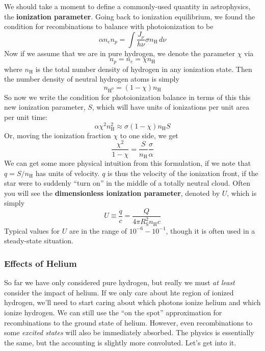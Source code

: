\documentclass[10pt]{article}
\numberwithin{equation}{section}
\newcommand{\n}{\noindent}
\begin{document}
\n We should take a moment to define a commonly-used quantity in astrophysics,
the \textbf{ionization parameter}. Going back to ionization equilibrium, we
found the condition for recombinations to balance with photoionization to be
\begin{equation}
  \label{eq:ip:1} \alpha n_e n_p = \int \frac{J_\nu}{h\nu}\sigma n_{\mathrm{H}}
  \,d\nu
\end{equation}
Now if we assume that we are in pure hydrogen, we denote the parameter $\chi$ 
via
\begin{equation}
  \label{eq:ip:2} n_p = n_e = \chi n_{\mathrm{H}}
\end{equation}
where $n_{\mathrm{H}}$ is the total number density of hydrogen in any ionization
state. Then the number density of neutral hydrogen atoms is simply
\begin{equation}
  \label{eq:ip:3} n_{\mathrm{H^0}} = (1-\chi)n_{\mathrm{H}}
\end{equation}
So now we write the condition for photoionization balance in terms of this this
new ionization parameter, $S$, which will have units of ionizations per unit
area per unit time:
\begin{equation}
  \label{eq:ip:4} \alpha \chi^2 n_{\mathrm{H}}^2 \approx \sigma(1-\chi) 
  n_{\mathrm{H}} S
\end{equation}
Or, moving the ionization fraction $\chi$ to one side, we get
\begin{equation}
  \label{eq:ip:5} \frac{\chi^2}{1-\chi} =
   \frac{S}{n_{\mathrm{H}}}\frac{\sigma}{\alpha}
\end{equation}
We can get some more physical intuition from this formulation, if we note that
$q = S/n_{\mathrm{H}}$ has units of velocity. $q$ is thus the velocity of the 
ionization front, if the star were to suddenly ``turn on'' in the middle of a 
totally neutral cloud. Often you will see the \textbf{dimensionless ionization
parameter}, denoted by $U$, which is simply
\begin{equation}
  \label{eq:ip:6} U \equiv \frac{q}{c} = \frac{Q}{4\pi R_{\mathrm{S}}^2
  n_{\mathrm{H}}c}
\end{equation}
Typical values for $U$ are in the range of $10^{-6}-10^{-1}$, though it is often
used in a steady-state situation.
\subsubsection{Effects of Helium} %
\label{ssub:effects_of_helium}
So far we have only considered pure hydrogen, but really we must \emph{at least}
consider the impact of helium. If we only care about hte region of ionized
hydrogen, we'll need to start caring about which photons ionize helium and which
ionize hydrogen. We can still use the ``on the spot'' approximation for
recombinations to the ground state of helium. However, even recombinations to
some \emph{excited states} will also be immediately absorbed. The physics is
essentially the same, but the accounting is slightly more convoluted. Let's get
into it.\\
\end{document}
